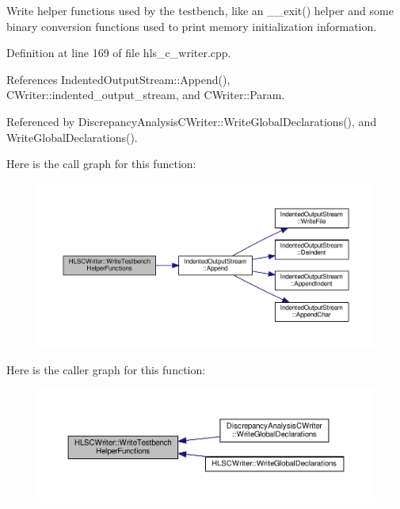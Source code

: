 Write helper functions used by the testbench, like an \+\_\+\+\_\+exit() helper and some binary conversion functions used to print memory initialization information. 



Definition at line 169 of file hls\+\_\+c\+\_\+writer.\+cpp.



References Indented\+Output\+Stream\+::\+Append(), C\+Writer\+::indented\+\_\+output\+\_\+stream, and C\+Writer\+::\+Param.



Referenced by Discrepancy\+Analysis\+C\+Writer\+::\+Write\+Global\+Declarations(), and Write\+Global\+Declarations().

Here is the call graph for this function\+:
\nopagebreak
\begin{figure}[H]
\begin{center}
\leavevmode
\includegraphics[width=350pt]{d4/db1/classHLSCWriter_a6eb118ed175fcbc9d2ab94c8e71ce420_cgraph}
\end{center}
\end{figure}
Here is the caller graph for this function\+:
\nopagebreak
\begin{figure}[H]
\begin{center}
\leavevmode
\includegraphics[width=350pt]{d4/db1/classHLSCWriter_a6eb118ed175fcbc9d2ab94c8e71ce420_icgraph}
\end{center}
\end{figure}
\mbox{\label{classHLSCWriter_a38348640f023a8c42330e4131263ece8}} 
